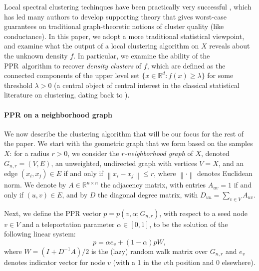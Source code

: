 \documentclass{article}
\newcommand{\Reals}{\mathbb{R}}
\newcommand{\Rd}{\Reals^d}
\newcommand{\norm}[1]{\left\lVert#1\right\rVert}
\newcommand{\1}{\mathbf{1}}
\newcommand{\pbf}{p}        %
\newcommand{\ebf}[1]{{e}_{#1}}
\newcommand{\Abf}{A}
\newcommand{\Xbf}{X}             %
\newcommand{\Wbf}{W}
\newcommand{\Dbf}{D}
\newcommand{\Ibf}[1]{I_{#1}}
\newcommand{\pprspace}{{\sc PPR~}}
\theoremstyle{aldenthm}
\theoremstyle{aldenrmrk}
\begin{document}
Local spectral clustering techinques have been practically very successful
\citep{leskovec2010,andersen2012,gleich2012,mahoney2012,wu2012}, which has led
many authors to develop supporting theory
\citep{spielman2013,andersen2009,gharan2012,zhu2013} that gives worst-case
guarantees on traditional graph-theoretic notions of cluster quality (like
conductance).  In this paper, we adopt a more traditional statistical viewpoint,
and examine what the output of a local clustering algorithm on $\Xbf$ reveals
about the unknown density $f$.  In particular, we examine the ability of the \pprspace algorithm to recover \emph{density clusters} of $f$, which are defined as the
connected components of the upper level set $\{x \in \Rd : f(x) \geq \lambda\}$
for some threshold $\lambda > 0$ (a central object of central interest in the
classical statistical literature on clustering, dating back to
\citet{hartigan1981}).

\paragraph{PPR on a neighborhood graph} We now describe the clustering algorithm that will be our focus for the rest of 
the paper. We start with the geometric graph that we form based on the samples 
$\Xbf$: for a radius $r > 0$, we consider the \emph{$r$-neighborhood graph} of 
$\Xbf$, denoted $G_{n,r}=(V,E)$, an unweighted, undirected graph with vertices
$V=\Xbf$, and an edge $(x_i,x_j) \in E$ if and only if $\norm{x_i - x_j}
\leq  r$, where $\norm{\cdot}$ denotes Euclidean norm. We denote by $\Abf \in \Reals^{n \times n}$ the adjacency matrix, with entries $\Abf_{uv} = 1$ if and only if $(u,v) \in E$, and by $\Dbf$ the diagonal degree matrix, with $\Dbf_{uu} = \sum_{v \in V} \Abf_{uv}$.

Next, we define the PPR vector $\pbf = \pbf(v,\alpha;G_{n,r})$, with respect to  
a seed node $v \in V$ and a teleportation parameter $\alpha \in [0,1]$, to be
the solution of the following linear system:
\begin{equation}
\label{eqn: ppr_vector}
\pbf = \alpha \ebf{v} + (1 - \alpha) \pbf \Wbf,
\end{equation}
where $\Wbf = (\Ibf{} + \Dbf^{-1}\Abf)/2$ is the (lazy) random walk matrix over $G_{n,r}$ 
and $e_{v}$ denotes indicator vector for node $v$ (with a 1 in the $v$th
position and 0 elsewhere).
\end{document}
